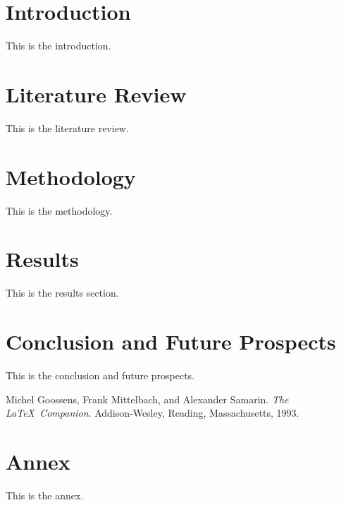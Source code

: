 \documentclass[12pt]{report}
\begin{document}
\newpage
{}
\setcounter{page}{1}
\raggedright

\chapter{Introduction}
% 
This is the introduction.

\newpage
\chapter{Literature Review}
% 
This is the literature review.

\newpage
\chapter{Methodology}
% 
This is the methodology.

\newpage
\chapter{Results}
% 
This is the results section.

\newpage
\chapter{Conclusion and Future Prospects}
% 
This is the conclusion and future prospects.

\newpage
{}
\begin{thebibliography}{9}
Michel Goossens, Frank Mittelbach, and Alexander Samarin. 
\textit{The \LaTeX\ Companion}. 
Addison-Wesley, Reading, Massachusetts, 1993.
\end{thebibliography}
% 
\newpage
\chapter{Annex}
% 
This is the annex.
\end{document}
